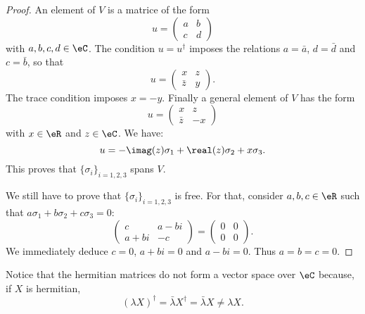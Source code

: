 \begin{proof}
	An element of \( V\) is a matrice of the form
	\begin{equation}
		u=\begin{pmatrix}
			a & b \\
			c & d
		\end{pmatrix}
	\end{equation}
	with \( a,b,c,d\in \eC\). The condition \( u=u^{\dag}\) imposes the relations \( a=\bar a\), \( d=\bar d\) and \( c=\bar b\), so that
	\begin{equation}
		u=\begin{pmatrix}
			x      & z \\
			\bar z & y
		\end{pmatrix}.
	\end{equation}
	The trace condition imposes \( x=-y\). Finally a general element of \( V\) has the form
	\begin{equation}
		u=\begin{pmatrix}
			x      & z  \\
			\bar z & -x
		\end{pmatrix}
	\end{equation}
	with \( x\in \eR\) and \( z\in \eC\). We have:
	\begin{equation}
		u=-\imag(z)\sigma_1+\real(z)\sigma_2+x\sigma_3.
	\end{equation}
	This proves that \( \{ \sigma_i \}_{i=1,2,3}\) spans \( V\).

	We still have to prove that \( \{ \sigma_i \}_{i=1,2,3}\) is free. For that, consider \( a,b,c\in \eR\) such that \( a\sigma_1+b\sigma_2+c\sigma_3=0\):
	\begin{equation}
		\begin{pmatrix}
			c    & a-bi \\
			a+bi & -c
		\end{pmatrix}=\begin{pmatrix}
			0 & 0 \\
			0 & 0
		\end{pmatrix}.
	\end{equation}
	We immediately deduce \( c=0\), \( a+bi=0\) and \( a-bi=0\). Thus \( a=b=c=0\).
\end{proof}

Notice that the hermitian matrices do not form a vector space over \( \eC\) because, if \( X\) is hermitian,
\begin{equation}
	(\lambda X)^{\dag}=\bar \lambda X^{\dag}=\bar \lambda X\neq \lambda X.
\end{equation}

